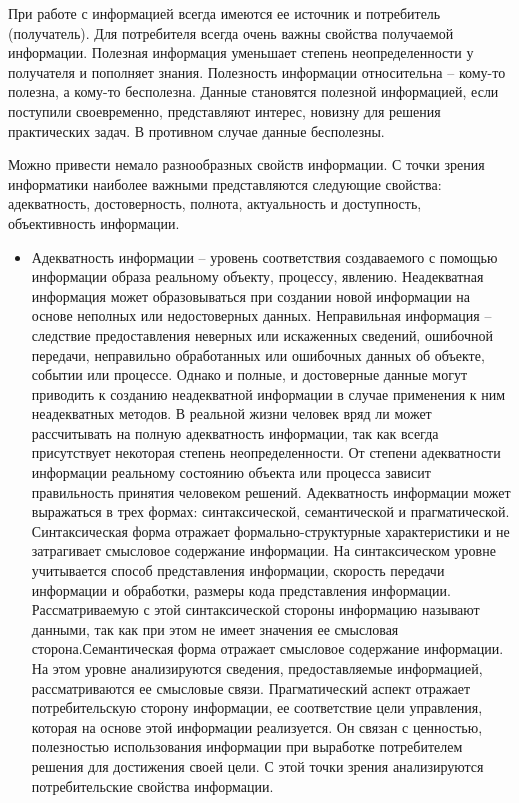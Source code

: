 \documentclass[a4paper]{article}
\begin{document}
 При работе с информацией всегда имеются ее источник и потребитель (получатель). Для потребителя всегда очень важны свойства получаемой информации. Полезная информация уменьшает степень неопределенности у получателя и пополняет знания. Полезность информации относительна – кому-то полезна, а кому-то бесполезна. Данные становятся полезной информацией, если поступили своевременно, представляют интерес, новизну для решения практических задач. В противном случае данные бесполезны.

Можно привести немало разнообразных свойств информации. С точки зрения информатики наиболее важными представляются следующие свойства: адекватность, достоверность, полнота, актуальность и доступность, объективность информации.

\begin{itemize}
\item Адекватность информации – уровень соответствия создаваемого с помощью информации образа реальному объекту, процессу, явлению. Неадекватная информация может образовываться при создании новой информации на основе неполных или недостоверных данных. Неправильная информация – следствие предоставления неверных или искаженных сведений, ошибочной передачи, неправильно обработанных или ошибочных данных об объекте, событии или процессе. Однако и полные, и достоверные данные могут приводить к созданию неадекватной информации в случае применения к ним неадекватных методов. В реальной жизни человек вряд ли может рассчитывать на полную адекватность информации, так как всегда присутствует некоторая степень неопределенности. От степени адекватности информации реальному состоянию объекта или процесса зависит правильность принятия человеком решений. Адекватность информации может выражаться в трех формах: синтаксической, семантической и прагматической. Синтаксическая форма отражает формально-структурные характеристики и не затрагивает смысловое содержание информации. На синтаксическом уровне учитывается способ представления информации, скорость передачи информации и обработки, размеры кода представления информации. Рассматриваемую с этой синтаксической стороны информацию называют данными, так как при этом не имеет значения ее смысловая сторона.Семантическая форма отражает смысловое содержание информации. На этом уровне анализируются сведения, предоставляемые информацией, рассматриваются ее смысловые связи. Прагматический аспект отражает потребительскую сторону информации, ее соответствие цели управления, которая на основе этой информации реализуется. Он связан с ценностью, полезностью использования информации при выработке потребителем решения для достижения своей цели. С этой точки зрения анализируются потребительские свойства информации.


\end{itemize}
\end{document}
